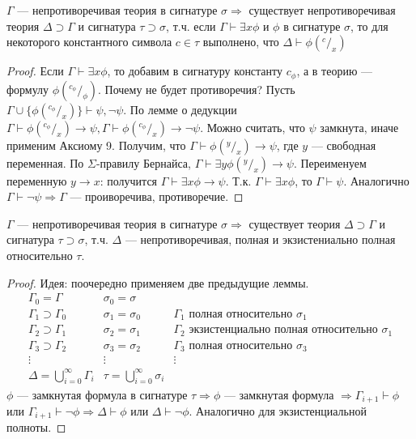 \begin{lemma}
    $\Gamma$ --- непротиворечивая теория в сигнатуре $\sigma \Rightarrow$ существует непротиворечивая теория $\Delta \supset \Gamma$ и сигнатура $\tau \supset \sigma$, т.ч. если $\Gamma \vdash \exists x \phi$ и $\phi$ в сигнатуре $\sigma$, то для некоторого константного символа $c \in \tau$ выполнено, что $\Delta \vdash \phi(^c/_x)$
\end{lemma}
\begin{proof}
    Если $\Gamma \vdash \exists x \phi$, то добавим в сигнатуру константу $c_\phi$, а в теорию --- формулу $\phi(^{c_\phi}/_\phi)$. Почему не будет противоречия? Пусть $\Gamma \cup \{\phi(^{c_\phi}/_x)\} \vdash \psi, \neg \psi$. По лемме о дедукции $\Gamma \vdash \phi(^{c_\phi}/_x) \rightarrow \psi, \Gamma \vdash \phi(^{c_\phi}/_x) \rightarrow \neg\psi$. Можно считать, что $\psi$ замкнута, иначе применим Аксиому 9. Получим, что $\Gamma \vdash \phi(^y/_x) \rightarrow \psi$, где $y$ --- свободная переменная. По $\Sigma$-правилу Бернайса, $\Gamma \vdash \exists y \phi(^y/_x) \rightarrow \psi$. Переименуем переменную $y \rightarrow x$: получится $\Gamma\vdash \exists x \phi \rightarrow \psi$. Т.к. $\Gamma \vdash \exists x \phi$, то $\Gamma \vdash \psi$. Аналогично $\Gamma \vdash \neg \psi \Rightarrow \Gamma$ --- проиворечива, противоречие.
\end{proof}

\begin{lemma}
    $\Gamma$ --- непротиворечивая теория в сигнатуре $\sigma \Rightarrow$ существует теория $\Delta \supset \Gamma$ и сигнатура $\tau \supset \sigma$, т.ч. $\Delta$ --- непротиворечивая, полная и экзистениально полная относительно $\tau$.
\end{lemma}
\begin{proof}
    Идея: поочередно применяем две предыдущие леммы.
    $$\begin{array}{ccl}
        \Gamma_0 = \Gamma & \sigma_0 = \sigma \\
        \Gamma_1 \supset \Gamma_0 & \sigma_1 = \sigma_0 & \text{$\Gamma_1$ полная относительно $\sigma_1$} \\
        \Gamma_2 \supset \Gamma_1 & \sigma_2 = \sigma_1 & \text{$\Gamma_2$ экзистенциально полная относительно $\sigma_1$} \\
        \Gamma_3 \supset \Gamma_2 & \sigma_3 = \sigma_2 & \text{$\Gamma_3$ полная относительно $\sigma_3$} \\
        \vdots & \vdots & \vdots \\
        \Delta = \bigcup_{i = 0}^\infty\Gamma_i & \tau = \bigcup_{i = 0}^\infty\sigma_i
    \end{array}$$
    $\phi$ --- замкнутая формула в сигнатуре $\tau \Rightarrow \phi$ --- замкнутая формула $\Rightarrow \Gamma_{i+1} \vdash \phi$ или $\Gamma_{i+1} \vdash \neg\phi \Rightarrow \Delta \vdash \phi$ или $\Delta \vdash \neg \phi$. Аналогично для экзистенциальной полноты.
\end{proof}

